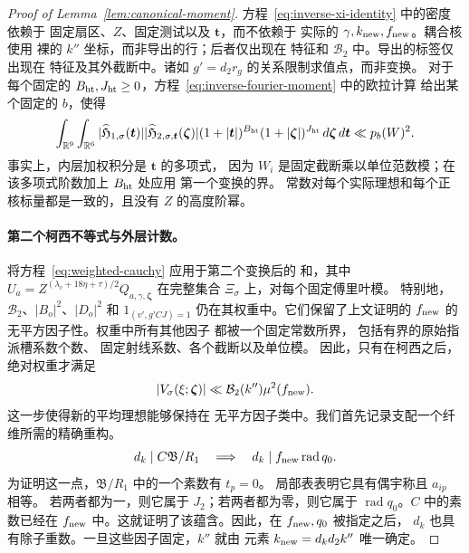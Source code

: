 \documentclass[11pt,a4paper]{article}
\numberwithin{equation}{section}
\numberwithin{figure}{section}
\theoremstyle{definition}
\theoremstyle{remark}
\begin{document}
\begin{proof}[Proof of Lemma~\ref{lem:canonical-moment}]
方程~\eqref{eq:inverse-xi-identity} 中的密度依赖于
固定扇区、\(Z\)、固定测试以及 \(\boldsymbol t\)，而不依赖于
实际的 \(\gamma,k_{\rm new},f_{\rm new}\)。耦合核使用
裸的 \(k''\) 坐标，而非导出的行；后者仅出现在
特征和 \(\mathcal B_2\) 中。导出的标签仅出现在
特征及其外截断中。诸如
\(g'=d_2r_g\) 的关系限制求值点，而非变换。
对于每个固定的 \(B_{\rm ht},J_{\rm ht}\ge0\)，方程~\eqref{eq:inverse-fourier-moment} 中的欧拉计算
给出某个固定的 \(b\)，使得
\begin{equation}\label{eq:inverse-joint-fourier-moments}
 \int_{\mathbb R^9}\int_{\mathbb R^6}
 |\widehat{\mathfrak H}_{1,\sigma}(\boldsymbol t)|
 |\widehat{\mathfrak H}_{2,\sigma,\boldsymbol t}(\boldsymbol\zeta)|
 (1+|\boldsymbol t|)^{B_{\rm ht}}(1+|\boldsymbol\zeta|)^{J_{\rm ht}}
 \,d\boldsymbol\zeta\,d\boldsymbol t\ll p_b(W)^2.
\end{equation}
事实上，内层加权积分是 \(\boldsymbol t\) 的多项式，
因为 \(W_i\) 是固定截断乘以单位范数模；在该多项式阶数加上 \(B_{\rm ht}\) 处应用
第一个变换的界。
常数对每个实际理想和每个正
核标量都是一致的，且没有 \(Z\) 的高度阶幂。

\paragraph{第二个柯西不等式与外层计数。}
将方程~\eqref{eq:weighted-cauchy} 应用于第二个变换后的
和，其中
\(U_a=Z^{(\lambda_c+18\eta+\tau)/2}Q_{a,\gamma,\boldsymbol\zeta}\)
在完整集合 \(\Xi_\sigma\) 上，对每个固定傅里叶模。
特别地，\(\mathcal B_2\)、\(|B_o|^2\)、\(|D_o|^2\) 和
\(1_{(v',g'CJ)=1}\) 仍在其权重中。它们保留了上文证明的 \(f_{\rm new}\) 的无平方因子性。权重中所有其他因子
都被一个固定常数所界，
包括有界的原始指派槽系数个数、
固定射线系数、各个截断以及单位模。
因此，只有在柯西之后，绝对权重才满足
\[
 |V_\sigma(\xi;\boldsymbol\zeta)|
 \ll \mathcal B_2(k'')\mu^2(f_{\rm new}).
\]
这一步使得新的平均理想能够保持在
无平方因子类中。我们首先记录支配一个纤维所需的精确重构。
\begin{equation}\label{eq:poisson-divisor-reconstruction}
 d_k\mid C\mathfrak B/R_1
 \quad\Longrightarrow\quad
 d_k\mid f_{\rm new}\operatorname{rad}q_0.
\end{equation}
为证明这一点，\(\mathfrak B/R_1\) 中的一个素数有 \(t_p=0\)。
局部表表明它具有偶宇称且 \(a_{ip}\) 相等。
若两者都为一，则它属于 \(J_2\)；若两者都为零，则它属于
\(\operatorname{rad}q_0\)。\(C\) 中的素数已经在
\(f_{\rm new}\) 中。这就证明了该蕴含。因此，在 \(f_{\rm new},q_0\) 被指定之后，
\(d_k\) 也具有除子重数。一旦这些因子固定，\(k''\) 就由
元素 \(k_{\rm new}=d_kd_2k''\) 唯一确定。


\end{proof}
\end{document}
